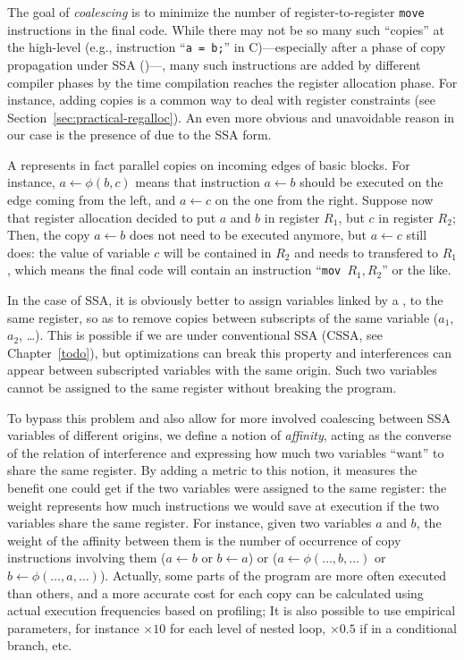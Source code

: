{The goal of \emph{coalescing} is to minimize the number of register-to-register {\tt move} instructions in the final code.
While there may not be so many such ``copies'' at the high-level (e.g., instruction ``{\tt a = b;}'' in C)---especially after a phase of copy propagation under SSA ()---,
many such instructions are added by different compiler phases by the time compilation reaches the register allocation phase.
For instance, adding copies is a common way to deal with register constraints (see Section~\ref{sec:practical-regalloc}). 
An even more obvious and unavoidable reason in our case is the presence of \phifuns due to the SSA form. 

A \phifun represents in fact parallel copies on incoming edges of basic blocks. 
For instance, $a \gets \phi(b,c)$ means that instruction $a\gets b$ should be executed on the edge coming from the left, and $a\gets c$ on the one from the right. 
Suppose now that register allocation decided to put $a$ and $b$ in register $R_1$, but $c$ in register $R_2$;
Then, the copy $a\gets b$ does not need to be executed anymore, but $a\gets c$ still does:
the value of variable $c$ will be contained in $R_2$ and needs to transfered to $R_1$, which means the final code will contain an instruction ``{\tt mov $R_1, R_2$}'' or the like. 


In the case of SSA, it is obviously better to assign variables linked by a \phifun, to the same register, so as to remove copies between subscripts of the same variable ($a_1$, $a_2$, \dots).
This is possible if we are under conventional SSA (CSSA, see Chapter~\ref{todo}), but optimizations can break this property and interferences can appear between subscripted variables with the same origin.
Such two variables cannot be assigned to the same register without breaking the program.

To bypass this problem and also allow for more involved coalescing between SSA variables of different origins,
we define a notion of \emph{affinity}, acting as the converse of the relation of interference and expressing how much two variables ``want'' to share the same register. 
By adding a metric to this notion, it measures the benefit one could get if the two variables were assigned to the same register:
the weight represents how much instructions we would save at execution if the two variables share the same register.
For instance, given two variables $a$ and $b$, the weight of the affinity between them is the number of occurrence of copy instructions involving them ($a\gets b$ or $b\gets a$) or \phifuns ($a\gets\phi(\ldots,b,\ldots)$ or $b\gets\phi(\ldots,a,\ldots)$).
Actually, some parts of the program are more often executed than others, and a more accurate cost for each copy can be calculated using actual execution frequencies based on profiling;
It is also possible to use empirical parameters, for instance $\times 10$ for each level of nested loop, $\times 0.5$ if in a conditional branch, etc.


}
